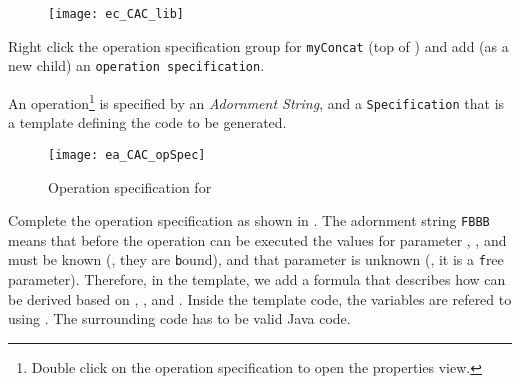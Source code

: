 \begin{stepbystep}
\begin{figure}[htbp]
\begin{center}
  \texttt{[image: ec\_CAC\_lib]}
  \caption{}  
  \label{ec_CAC_lib}
\end{center}
\end{figure}
\item
Right click the operation specification group for \texttt{myConcat} (top of ) and add (as a new child) an \texttt{operation specification}. 
\end{stepbystep}

An operation\footnote{Double click on the operation specification to open the properties view.} is specified by an \emph{Adornment String}, and a \texttt{Specification} that is a template defining the code to be generated.

\begin{figure}[htbp]
\begin{center}
  \texttt{[image: ea\_CAC\_opSpec]}
  \caption{Operation specification for }  
  \label{ea_CAC_opSpec}
\end{center}
\end{figure}

\begin{stepbystep}
\item Complete the operation specification as shown in . The adornment string \texttt{FBBB} means that before the operation can be executed the values for parameter , , and  must be known (\idest, they are \texttt{b}ound), and that parameter  is unknown (\idest, it is a \texttt{f}ree parameter).
Therefore, in the  template, we add a formula that describes how  can be derived based on , , and .
Inside the template code, the variables are refered to using \entity{\$}.
The surrounding code has to be valid Java code.
\end{stepbystep}

